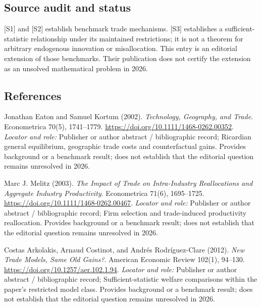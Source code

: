 \documentclass[11pt,a4paper]{article}
\begin{document}
\subsection*{Source audit and status}
[S1] and [S2] establish benchmark trade mechanisms. [S3] establishes a sufficient-statistic relationship under its maintained restrictions; it is not a theorem for arbitrary endogenous innovation or misallocation. This entry is an editorial extension of those benchmarks. Their publication does not certify the extension as an unsolved mathematical problem in 2026.

\subsection*{References}

\begin{enumerate}[label={[S\arabic*]},leftmargin=*]

\item Jonathan Eaton and Samuel Kortum (2002). \emph{Technology, Geography, and Trade}. Econometrica 70(5), 1741–1779. \url{https://doi.org/10.1111/1468-0262.00352}.
\textit{Locator and role:} Publisher or author abstract / bibliographic record; Ricardian general equilibrium, geographic trade costs and counterfactual gains. Provides background or a benchmark result; does not establish that the editorial question remains unresolved in 2026.

\item Marc J. Melitz (2003). \emph{The Impact of Trade on Intra-Industry Reallocations and Aggregate Industry Productivity}. Econometrica 71(6), 1695–1725. \url{https://doi.org/10.1111/1468-0262.00467}.
\textit{Locator and role:} Publisher or author abstract / bibliographic record; Firm selection and trade-induced productivity reallocation. Provides background or a benchmark result; does not establish that the editorial question remains unresolved in 2026.

\item Costas Arkolakis, Arnaud Costinot, and Andrés Rodríguez-Clare (2012). \emph{New Trade Models, Same Old Gains?}. American Economic Review 102(1), 94–130. \url{https://doi.org/10.1257/aer.102.1.94}.
\textit{Locator and role:} Publisher or author abstract / bibliographic record; Sufficient-statistic welfare comparisons within the paper’s restricted model class. Provides background or a benchmark result; does not establish that the editorial question remains unresolved in 2026.

\end{enumerate}
\end{document}
